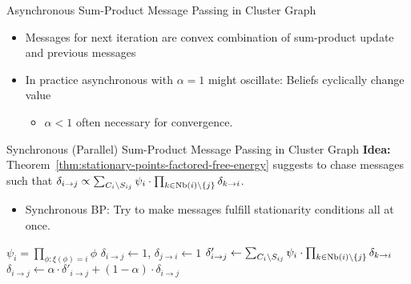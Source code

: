 \begin{frame}{Asynchronous Sum-Product Message Passing in Cluster Graph}
\begin{minipage}{0.39\textwidth}
\begin{itemize}
\begin{itemize}
    \end{itemize}
    \pause \item Messages for next iteration are convex combination of sum-product update and previous messages
    \pause \item In practice asynchronous with $\alpha = 1$ might oscillate: Beliefs cyclically change value
    \begin{itemize}
        \pause \item $\alpha < 1$ often necessary for convergence.
    \end{itemize}
\end{itemize}
\end{minipage}
\end{frame}

\begin{frame}{Synchronous (Parallel) Sum-Product Message Passing in Cluster Graph}
    \textbf{Idea:} Theorem~\ref{thm:stationary-points-factored-free-energy} suggests to chase messages such that $\delta_{i \rightarrow j} \propto \sum_{C_i \backslash S_{ij}} \psi_i \cdot \prod_{k \in \text{Nb}(i) \backslash \{j\}} \delta_{k \rightarrow i}$.
    \pause
    \begin{itemize}
        \item Synchronous BP: Try to make messages fulfill stationarity conditions all at once.
    \end{itemize}
    \begin{minipage}{0.6\textwidth}
\begin{algorithm}[H]
    \caption{Synchronous Sum-Product Message Passing in Cluster Graph}
    \label{alg:synchronous-spmp}
    {
        $\psi_i = \prod_{\phi: \xi(\phi) = i} \phi$\;
    }
    \pause
    {
        $\delta_{i \rightarrow j} \leftarrow 1$, $\delta_{j \rightarrow i} \leftarrow 1$\;
    }
    \pause
    {
        {
            $\delta'_{i \rightarrow j} \leftarrow \sum_{C_i \backslash S_{ij}} \psi_i \cdot \prod_{k \in \text{Nb}(i) \backslash \{j\}} \delta_{k \rightarrow i}$\;
        }
        \pause
        {
            $\delta_{i \rightarrow j} \leftarrow \alpha \cdot \delta'_{i \rightarrow j} + (1-\alpha) \cdot \delta_{i \rightarrow j}$\;
        }
    }
    \pause

\end{algorithm}
\end{minipage}
\end{frame}
